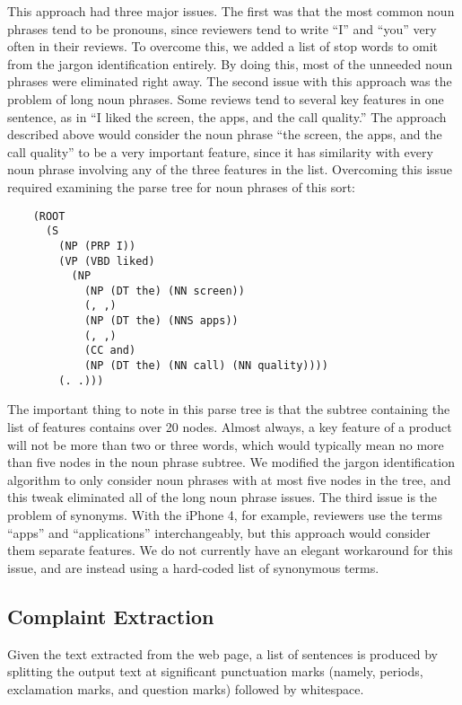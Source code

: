 \documentclass{article}
\begin{document}
This approach had three major issues.  The first was that the most common noun phrases tend to be pronouns, since reviewers tend to write ``I'' and ``you'' very often in their reviews.  To overcome this, we added a list of stop words to omit from the jargon identification entirely.  By doing this, most of the unneeded noun phrases were eliminated right away.  The second issue with this approach was the problem of long noun phrases.  Some reviews tend to several key features in one sentence, as in ``I liked the screen, the apps, and the call quality.''  The approach described above would consider the noun phrase ``the screen, the apps, and the call quality'' to be a very important feature, since it has similarity with every noun phrase involving any of the three features in the list.  Overcoming this issue required examining the parse tree for noun phrases of this sort:
\begin{verbatim}
	(ROOT
	  (S
	    (NP (PRP I))
	    (VP (VBD liked)
	      (NP
	        (NP (DT the) (NN screen))
	        (, ,)
	        (NP (DT the) (NNS apps))
	        (, ,)
	        (CC and)
	        (NP (DT the) (NN call) (NN quality))))
	    (. .)))
\end{verbatim}
The important thing to note in this parse tree is that the subtree containing the list of features contains over 20 nodes.  Almost always, a key feature of a product will not be more than two or three words, which would typically mean no more than five nodes in the noun phrase subtree.  We modified the jargon identification algorithm to only consider noun phrases with at most five nodes in the tree, and this tweak eliminated all of the long noun phrase issues.  The third issue is the problem of synonyms.  With the iPhone 4, for example, reviewers use the terms ``apps'' and ``applications'' interchangeably, but this approach would consider them separate features.  We do not currently have an elegant workaround for this issue, and are instead using a hard-coded list of synonymous terms.


\subsection{Complaint Extraction} %

Given the text extracted from the web page, a list of sentences is produced by
splitting the output text at significant punctuation marks (namely, periods,
exclamation marks, and question marks) followed by whitespace.
\end{document}
